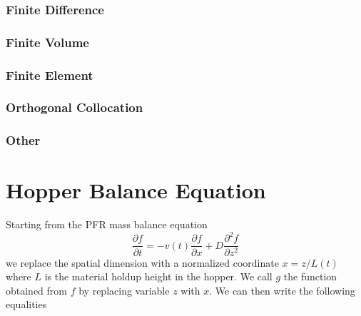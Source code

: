 \documentclass{article}
\begin{document}
\subsubsection{Finite Difference}
\subsubsection{Finite Volume}
\subsubsection{Finite Element}
\subsubsection{Orthogonal Collocation}
\subsubsection{Other}

\newpage{}
\appendix
\section{Hopper Balance Equation}
\label{sec:hopper_balance}
Starting from the PFR mass balance equation
\begin{equation}
    \frac{\partial f}{\partial t} = - v(t)\frac{\partial f}{\partial x} + D\frac{\partial^2 f}{\partial z^2}
\end{equation}
we replace the spatial dimension with a normalized coordinate $x = z/L(t)$ where $L$ is the material holdup height in the hopper. We call $g$ the function obtained from $f$ by replacing variable $z$ with $x$. We can then write the following equalities
\end{document}
